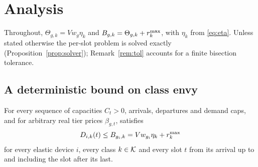 \section{Analysis}\label{sec:analysis}

Throughout, $\Theta_{g,k}=V w_g\eta_k$ and $B_{g,k}=\Theta_{g,k}+r^{\max}_k$, with $\eta_k$ from \eqref{eq:eta}.
Unless stated otherwise the per-slot problem is solved exactly (Proposition~\ref{prop:solver}); Remark~\ref{rem:tol} accounts for a finite bisection tolerance.

\subsection{A deterministic bound on class envy}\label{sec:envy}

\begin{theorem}\label{thm:bound}
For every sequence of capacities $C_t>0$, arrivals, departures and demand caps, and for arbitrary real tier prices $\beta_{g,t}$, \repay{} satisfies
\[
D_{i,k}(t)\le B_{g_i,k}=V w_{g_i}\eta_k+r^{\max}_k
\]
for every elastic device $i$, every class $k\in\mathcal{K}$ and every slot $t$ from its arrival up to and including the slot after its last.
\end{theorem}

